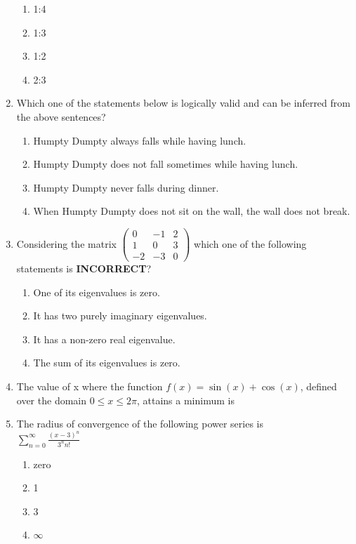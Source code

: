 \documentclass[journal]{IEEEtran}
\numberwithin{equation}{enumi}
\numberwithin{figure}{enumi}
\begin{document}
\begin{enumerate}[start=1]
\begin{enumerate}
    \item 1:4
    \item 1:3
    \item 1:2
    \item 2:3
\end{enumerate}
\item Which one of the statements below is logically valid and can be inferred from the above sentences?
    \begin{enumerate}
        \item Humpty Dumpty always falls while having lunch.
        \item Humpty Dumpty does not fall sometimes while having lunch.
        \item Humpty Dumpty never falls during dinner.
        \item When Humpty Dumpty does not sit on the wall, the wall does not break.
    \end{enumerate}
    \newpage
\item Considering the matrix
    $\begin{pmatrix}
     0 & -1 & 2 \\ 1 & 0 & 3 \\ -2 & -3 & 0   
    \end{pmatrix}$
    which one of the following statements is \textbf{INCORRECT}?
    \begin{enumerate}
        \item One of its eigenvalues is zero.
        \item It has two purely imaginary eigenvalues.
        \item It has a non-zero real eigenvalue.
        \item The sum of its eigenvalues is zero.
    \end{enumerate}
\item The value of x where the function $f(x)=\sin(x)+\cos(x)$, defined over the domain $0\leq x\leq 2\pi$, attains a minimum is
\item The radius of convergence of the following power series is 
\\
    $\sum_{n=0}^{\infty}\frac{(x-3)^n}{3^n n!}$
\begin{enumerate}
    \item zero
    \item 1
    \item 3
    \item $\infty$
\end{enumerate}
\end{enumerate}
\end{document}
